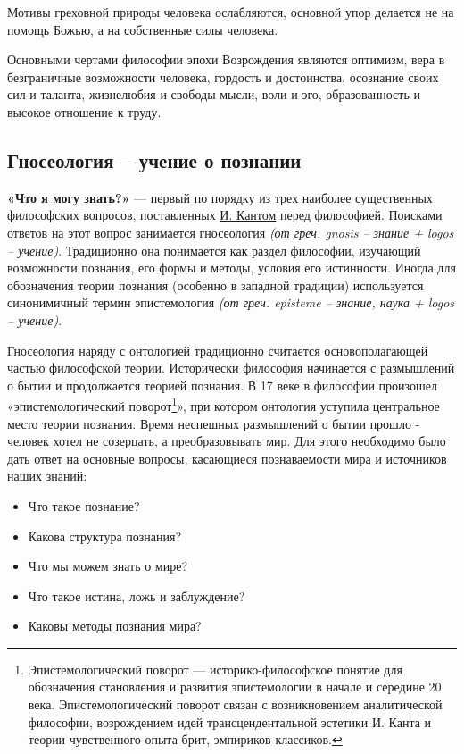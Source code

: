 \documentclass[a4paper, 14pt]{extreport}
\begin{document}
Мотивы греховной природы человека ослабляются, основной упор делается не
на помощь Божью, а на собственные силы человека.

Основными чертами философии эпохи Возрождения являются оптимизм, вера в
безграничные возможности человека, гордость и достоинства, осознание
своих сил и таланта, жизнелюбия и свободы мысли, воли и эго,
образованность и высокое отношение к труду.

\subsection{Гносеология -- учение о познании}

\textbf{«Что я могу знать?»} --- первый по порядку из трех наиболее
существенных философских вопросов, поставленных
\href{https://ru.wikipedia.org/wiki/\%D0\%9A\%D0\%B0\%D0\%BD\%D1\%82,_\%D0\%98\%D0\%BC\%D0\%BC\%D0\%B0\%D0\%BD\%D1\%83\%D0\%B8\%D0\%BB}{И.
Кантом} перед философией. Поисками ответов на этот вопрос занимается
гносеология \emph{(от греч. gnosis -- знание + logos -- учение)}.
Традиционно она понимается как раздел философии, изучающий возможности
познания, его формы и методы, условия его истинности. Иногда для
обозначения теории познания (особенно в западной традиции) используется
синонимичный термин эпистемология \emph{(от греч. episteme -- знание,
наука + logos -- учение)}.

Гносеология наряду с онтологией традиционно считается основополагающей
частью философской теории. Исторически философия начинается с
размышлений о бытии и продолжается теорией познания. В 17 веке в
философии произошел «эпистемологический поворот\footnote{Эпистемологический
  поворот --- историко-философское понятие для обозначения становления и
  развития эпистемологии в начале и середине 20 века. Эпистемологический
  поворот связан с возникновением аналитической философии, возрождением
  идей трансцендентальной эстетики И. Канта и теории чувственного опыта
  брит, эмпириков-классиков.}», при котором онтология уступила
центральное место теории познания. Время неспешных размышлений о бытии
прошло - человек хотел не созерцать, а преобразовывать мир. Для этого
необходимо было дать ответ на основные вопросы, касающиеся познаваемости
мира и источников наших знаний:

\begin{itemize}

\item
  Что такое познание?
\item
  Какова структура познания?
\item
  Что мы можем знать о мире?
\item
  Что такое истина, ложь и заблуждение?
\item
  Каковы методы познания мира?
\end{itemize}
\end{document}
